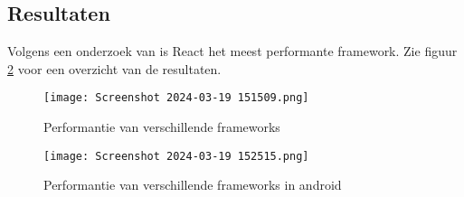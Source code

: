 \subsection*{Resultaten}%
Volgens een onderzoek van \autocite{DeNeve2021} is React het meest performante
framework. Zie figuur \ref{fig:performantie} voor een overzicht van de
resultaten.

\begin{figure}[h]
    \centering
    \texttt{[image: Screenshot 2024-03-19 151509.png]}
    \caption{Performantie van verschillende frameworks}
    \label{fig:performantie}
\end{figure}

\begin{figure}[h]
    \centering
    \texttt{[image: Screenshot 2024-03-19 152515.png]}
    \caption{Performantie van verschillende frameworks in android}
    \label{fig:performantie}
\end{figure}

\lipsum[7-20]
